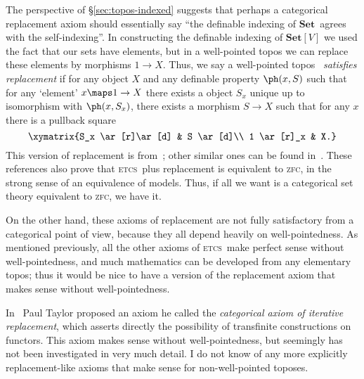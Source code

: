 \documentclass{amsart}
\newcommand{\Set}{\ensuremath{\mathbf{Set}}}
\def\zfc{\textsc{zfc}}
\def\wptnc{\textsc{wptnc}}
\def\etcs{\textsc{etcs}}
\begin{document}
The perspective of \S\ref{sec:topos-indexed} suggests that perhaps a
categorical replacement axiom should essentially say ``the definable
indexing of \Set\ agrees with the self-indexing''.  In constructing
the definable indexing of $\Set[V]$ we used the fact that our sets
have elements, but in a well-pointed topos we can replace these
elements by morphisms $1\to X$.  Thus, we say a well-pointed topos
\bS\ \emph{satisfies replacement} if for any object $X$ and any
definable property $\ph(x,S)$ such that for any `element' $x\maps 1\to
X$ there exists a object $S_x$ unique up to isomorphism with
$\ph(x,S_x)$, there exists a morphism $S\to X$ such that for any $x$
there is a pullback square
\[\xymatrix{S_x \ar[r]\ar[d] & S \ar[d]\\
  1 \ar[r]_x & X.}\]
This version of replacement is from~\cite{mclarty:catstruct}; other
similar ones can be found in~\cite{osius:cat-setth,lawvere:etcs-long}.
These references also prove that \etcs\ plus replacement is equivalent
to \zfc, in the strong sense of an equivalence of models.  Thus, if
all we want is a categorical set theory equivalent to \zfc, we have
it.


On the other hand, these axioms of replacement are not fully
satisfactory from a categorical point of view, because they all depend
heavily on well-pointedness.  As mentioned previously, all the other
axioms of \etcs\ make perfect sense without well-pointedness, and much
mathematics can be developed from any elementary topos; thus it would
be nice to have a version of the replacement axiom that makes sense
without well-pointedness.

In~\cite[Ch.~9]{taylor:pracfdn} Paul Taylor proposed an axiom he
called the \emph{categorical axiom of iterative replacement}, which
asserts directly the possibility of transfinite constructions on
functors.  This axiom makes sense without well-pointedness, but
seemingly has not been investigated in very much detail.  I do not
know of any more explicitly replacement-like axioms that make sense
for non-well-pointed toposes.

\end{document}
